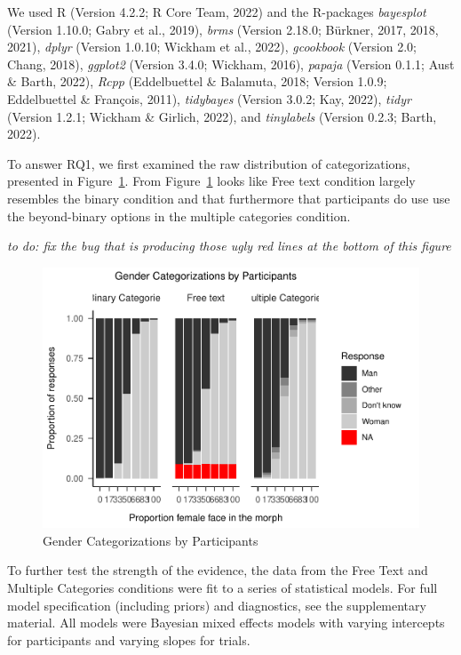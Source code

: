 \documentclass[
  man]{apa7}
\begin{document}
We used R (Version 4.2.2; R Core Team, 2022) and the R-packages \emph{bayesplot} (Version 1.10.0; Gabry et al., 2019), \emph{brms} (Version 2.18.0; Bürkner, 2017, 2018, 2021), \emph{dplyr} (Version 1.0.10; Wickham et al., 2022), \emph{gcookbook} (Version 2.0; Chang, 2018), \emph{ggplot2} (Version 3.4.0; Wickham, 2016), \emph{papaja} (Version 0.1.1; Aust \& Barth, 2022), \emph{Rcpp} (Eddelbuettel \& Balamuta, 2018; Version 1.0.9; Eddelbuettel \& François, 2011), \emph{tidybayes} (Version 3.0.2; Kay, 2022), \emph{tidyr} (Version 1.2.1; Wickham \& Girlich, 2022), and \emph{tinylabels} (Version 0.2.3; Barth, 2022).

To answer RQ1, we first examined the raw distribution of categorizations, presented in Figure~\ref{fig:descriptives}. From Figure~\ref{fig:descriptives} looks like Free text condition largely resembles the binary condition and that furthermore that participants do use use the beyond-binary options in the multiple categories condition.

\emph{to do: fix the bug that is producing those ugly red lines at the bottom of this figure}

\begin{figure}
\centering
\includegraphics{papaja-test_files/figure-latex/descriptives-1.pdf}
\caption{\label{fig:descriptives}Gender Categorizations by Participants}
\end{figure}

To further test the strength of the evidence, the data from the Free Text and Multiple Categories conditions were fit to a series of statistical models. For full model specification (including priors) and diagnostics, see the supplementary material. All models were Bayesian mixed effects models with varying intercepts for participants and varying slopes for trials.
\end{document}
